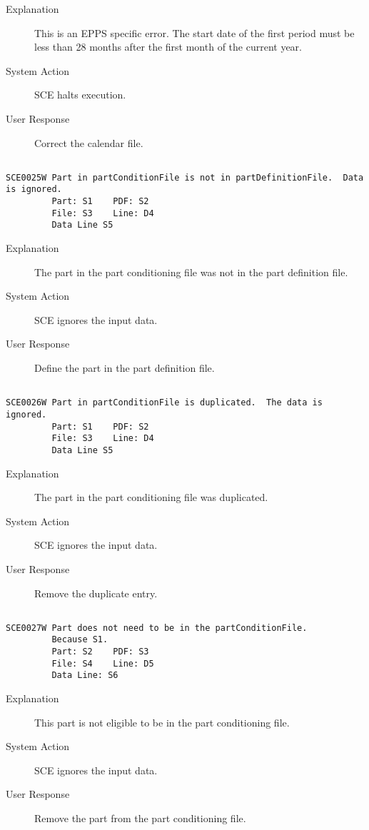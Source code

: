 \begin{description}
\item[Explanation]  This is an EPPS specific error.
 The start date of the first period must be less than 28 months after the first month of the current year.

\item[System Action]  SCE halts execution.

\item[User Response]  Correct the calendar file.
\end{description}
\hrulefill
\begin{verbatim}

SCE0025W Part in partConditionFile is not in partDefinitionFile.  Data is ignored.
         Part: S1    PDF: S2
         File: S3    Line: D4
         Data Line S5
\end{verbatim}
\begin{description}
\item[Explanation]  The part in the part conditioning file was not in the
 part definition file.

\item[System Action]  SCE ignores the input data.	

\item[User Response]  Define the part in the part definition file.
\end{description}
\hrulefill
\begin{verbatim}

SCE0026W Part in partConditionFile is duplicated.  The data is ignored.
         Part: S1    PDF: S2
         File: S3    Line: D4
         Data Line S5
\end{verbatim}
\begin{description}
\item[Explanation]  The part in the part conditioning file was duplicated.

\item[System Action]  SCE ignores the input data.	

\item[User Response]  Remove the duplicate entry.
\end{description}
\hrulefill
\begin{verbatim}

SCE0027W Part does not need to be in the partConditionFile.
         Because S1.
         Part: S2    PDF: S3
         File: S4    Line: D5
         Data Line: S6
\end{verbatim}
\begin{description}
\item[Explanation]  This part is not eligible to be in the part conditioning file.

\item[System Action]  SCE ignores the input data.

\item[User Response]  Remove the part from the part conditioning file.
\end{description}
